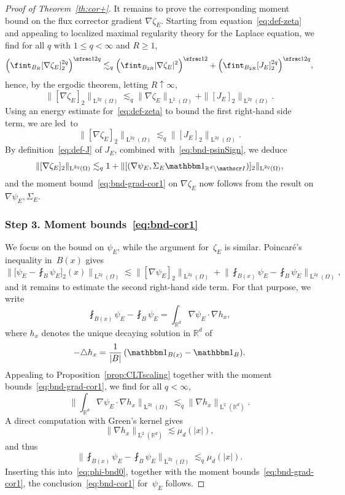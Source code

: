 \documentclass[10pt]{amsart}
\let\mathcal\mathscr
\let\mathds\mathbbm
\theoremstyle{plain}
\theoremstyle{definition}
\newcommand{\R}{\mathbb R}
\newcommand{\Ic}{\mathcal I}
\newcommand{\Ld}{\operatorname{L}}
\newcommand{\step}[1]{\subsubsection*{Step #1}}
\begin{document}
\begin{proof}[Proof of Theorem~\ref{th:cor+}]
It remains to prove the corresponding moment bound on the flux corrector gradient $\nabla\zeta_E$. Starting from equation~\eqref{eq:def-zeta} and appealing to localized maximal regularity theory for the Laplace equation, we find for all $q$ with $1\le q<\infty$ and $R\ge1$,
\[\Big(\fint_{B_R}[\nabla\zeta_E]_2^{2q}\Big)^{\sfrac1{2q}}\lesssim_q \Big(\fint_{B_{2R}}|\nabla\zeta_E|^{2}\Big)^{\sfrac12}+\Big(\fint_{B_{2R}}[J_E]_2^{2q}\Big)^{\sfrac1{2q}},\]
hence, by the ergodic theorem, letting $R\uparrow\infty$,
\[\|[\nabla\zeta_E]_2\|_{\Ld^{2q}(\Omega)}\lesssim_q \|\nabla\zeta_E\|_{\Ld^2(\Omega)}+\|[J_E]_2\|_{\Ld^{2q}(\Omega)}.\]
Using an energy estimate for~\eqref{eq:def-zeta} to bound the first right-hand side term, we are led~to
\[\|[\nabla\zeta_E]_2\|_{\Ld^{2q}(\Omega)}\lesssim_q \|[J_E]_2\|_{\Ld^{2q}(\Omega)}.\]
By definition~\eqref{eq:def-J} of $J_E$, combined with~\eqref{eq:bnd-psinSign}, we deduce
\[\|[\nabla\zeta_E]_2\|_{\Ld^{2q}(\Omega)}\lesssim_q 1+\|[(\nabla\psi_E,\Sigma_E\mathds1_{\R^d\setminus\Ic})]_2\|_{\Ld^{2q}(\Omega)},\]
and the moment bound~\eqref{eq:bnd-grad-cor1} on $\nabla\zeta_E$ now follows from the result on $\nabla\psi_E,\Sigma_E$.

\step{3. Moment bounds~\eqref{eq:bnd-cor1}}
We focus on the bound on $\psi_E$, while the argument for~$\zeta_E$ is similar.
Poincaré's inequality in~$B(x)$ gives
\begin{equation}\label{eq:phi-bnd0}
\bigg\|\Big[\psi_E-\fint_{B}\psi_E\Big]_2(x)\bigg\|_{\Ld^{2q}(\Omega)}\lesssim \|[\nabla\psi_E]_2\|_{\Ld^{2q}(\Omega)}+\Big\|\fint_{B(x)}\psi_E-\fint_{B}\psi_E\Big\|_{\Ld^{2q}(\Omega)},
\end{equation}
and it remains to estimate the second right-hand side term.
For that purpose, we write
\[\fint_{B(x)}\psi_E-\fint_{B}\psi_E=\int_{\R^d}\nabla\psi_E\cdot\nabla h_{x},\]
where $h_x$ denotes the unique decaying solution in $\R^d$ of
\[-\triangle h_x=\frac{1}{|B|}\,(\mathds1_{B(x)}-\mathds1_B).\]
Appealing to Proposition~\ref{prop:CLTscaling} together with the moment bounds~\eqref{eq:bnd-grad-cor1}, we find for all \mbox{$q<\infty$},
\[\Big\|\int_{\R^d}\nabla\psi_E\cdot\nabla h_{x}\Big\|_{\Ld^{2q}(\Omega)}\lesssim_q \|\nabla h_{x}\|_{\Ld^2(\R^d)}.\]
A direct computation with Green's kernel gives
\[\|\nabla h_{x}\|_{\Ld^2(\R^d)}\lesssim \mu_d(|x|),\]
and thus
\[\Big\|\fint_{B(x)}\psi_E-\fint_{B}\psi_E\Big\|_{\Ld^{2q}(\Omega)}\lesssim_q \mu_d(|x|).\]
Inserting this into~\eqref{eq:phi-bnd0}, together with the moment bounds~\eqref{eq:bnd-grad-cor1},
the conclusion~\eqref{eq:bnd-cor1} for~$\psi_E$ follows.
\end{proof}
\end{document}
